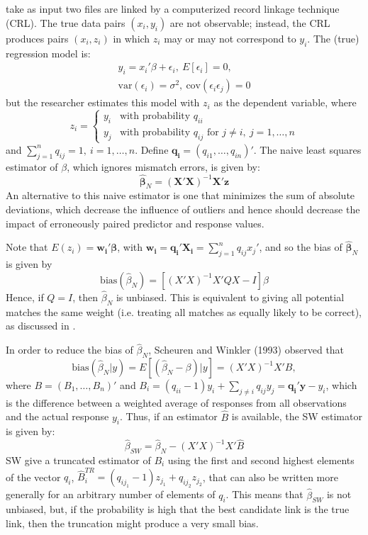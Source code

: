 \documentclass[12pt]{article}
\begin{document}
\subsection{\cite{lahiri05}}
\cite{lahiri05} take as input two files are linked by a computerized record linkage technique (CRL).  The true data pairs $(x_i, y_i)$ are not observable; instead, the CRL produces pairs $(x_i, z_i)$ in which $z_i$ may or may not correspond to $y_i$.  The (true) regression model is:
\begin{gather*}y_i = x_i'\beta + \epsilon_i,\ E[\epsilon_i] = 0,\\ \text{var}(\epsilon_i) = \sigma^2,\ \text{cov}(\epsilon_i \epsilon_j) = 0 \end{gather*}
but the researcher estimates this model with $z_i$ as the dependent variable, where $$z_i = \begin{cases} y_i & \text{with probability $q_{ii}$} \\ y_j & \text{with probability $q_{ij}$ for $j\neq i,\ j = 1,\dots,n $} \end{cases}$$ 
and $\sum_{j=1}^n q_{ij} = 1, \ i=1,\dots, n$.  Define $\mathbf{q_i} = (q_{i1}, \dots, q_{in})'$.  The naive least squares estimator of $\beta$, which ignores mismatch errors, is given by:
$$\hat{\mathbf{\beta}}_N = (\mathbf{X'X})^{-1} \mathbf{X'z} $$ 
An alternative to this naive estimator is one that minimizes the sum of absolute deviations, which decrease the influence of outliers and hence should decrease the impact of erroneously paired predictor and response values.  

Note that $E(z_i) = \mathbf{w_i'\beta}$, with $\mathbf{w_i = q_i'X_i} = \sum_{j=1}^n q_{ij} x_j' $, and so the bias of $\hat{\mathbf{\beta}}_N $ is given by
$$\text{bias}(\hat{\beta}_N) = [(X'X)^{-1} X'QX - I] \beta $$ 
Hence, if $Q = I$, then $\hat{\beta}_N$ is unbiased.  This is equivalent to giving all potential matches the same weight (i.e. treating all matches as equally likely to be correct), as discussed in \cite{ahl2019}.  

In order to reduce the bias of $\hat{\beta}_N$, Scheuren and Winkler (1993) %
observed that 
$$\text{bias} (\hat{\beta}_N | y) = E[(\hat{\beta}_N - \beta) | y ] = (X'X)^{-1} X'B,$$ 
where $B = (B_1, \dots, B_n)'$ and $B_i = (q_{ii}-1)y_i + \sum_{j\neq i } q_{ij} y_j = \mathbf{q_i'y} - y_i$, which is the difference between a weighted average of responses from all observations and the actual response $y_i$.  Thus, if an estimator $\hat{B}$ is available, the SW estimator is given by:
$$ \hat{\beta}_{SW} = \hat{\beta}_N - (X'X)^{-1} X' \hat{B}$$ 
SW give a truncated estimator of $B_i$ using the first and second highest elements of the vector $q_i$, $\hat{B}_i^{TR} = (q_{ij_1} - 1) z_{j_1} + q_{ij_2} z_{j_2}$, that can also be written more generally for an arbitrary number of elements of $q_i$.  This means that $\hat{\beta}_{SW}$ is not unbiased, but, if the probability is high that the best candidate link is the true link, then the truncation might produce a very small bias. 
\end{document}
